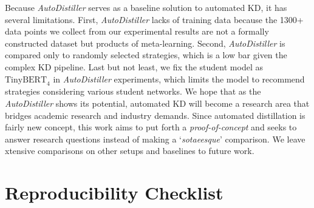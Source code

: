 \documentclass[11pt]{article}
\begin{document}
Because \emph{AutoDistiller} serves as a baseline solution to automated KD, it has several limitations. First, \emph{AutoDistiller} lacks of training data because the 1300+ data points we collect from our experimental results are not a formally constructed dataset but products of meta-learning. Second, \emph{AutoDistiller} is compared only to randomly selected strategies, which is a low bar given the complex KD pipeline. Last but not least, we fix the student model as $\text{TinyBERT}_4$ in \emph{AutoDistiller} experiments, which limits the model to recommend strategies considering various student networks. We hope that as the \emph{AutoDistiller} shows its potential, automated KD will become a research area that bridges academic research and industry demands. Since automated distillation is fairly new concept, this work aims to put forth a \emph{proof-of-concept} and seeks to answer research questions instead of making a `\emph{sotaeesque}' comparison. We leave xtensive comparisons on other setups and baselines to future work.









%

%
\newpage
\section{Reproducibility Checklist}
\end{document}
